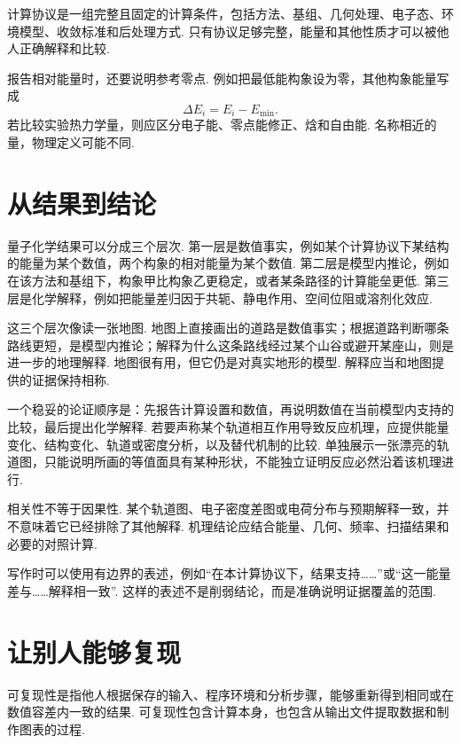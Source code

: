 \documentclass[UTF8,11pt,a4paper,openany]{ctexbook}
\begin{document}
\begin{definitionbox}
计算协议是一组完整且固定的计算条件，包括方法、基组、几何处理、电子态、环境模型、收敛标准和后处理方式. 只有协议足够完整，能量和其他性质才可以被他人正确解释和比较. 
\end{definitionbox}

报告相对能量时，还要说明参考零点. 例如把最低能构象设为零，其他构象能量写成
\[
\Delta E_i=E_i-E_{\min}.
\]
若比较实验热力学量，则应区分电子能、零点能修正、焓和自由能. 名称相近的量，物理定义可能不同. 

\section{从结果到结论}

量子化学结果可以分成三个层次. 第一层是数值事实，例如某个计算协议下某结构的能量为某个数值，两个构象的相对能量为某个数值. 第二层是模型内推论，例如在该方法和基组下，构象甲比构象乙更稳定，或者某条路径的计算能垒更低. 第三层是化学解释，例如把能量差归因于共轭、静电作用、空间位阻或溶剂化效应. 

\begin{analogybox}
这三个层次像读一张地图. 地图上直接画出的道路是数值事实；根据道路判断哪条路线更短，是模型内推论；解释为什么这条路线经过某个山谷或避开某座山，则是进一步的地理解释. 地图很有用，但它仍是对真实地形的模型. 解释应当和地图提供的证据保持相称. 
\end{analogybox}

一个稳妥的论证顺序是：先报告计算设置和数值，再说明数值在当前模型内支持的比较，最后提出化学解释. 若要声称某个轨道相互作用导致反应机理，应提供能量变化、结构变化、轨道或密度分析，以及替代机制的比较. 单独展示一张漂亮的轨道图，只能说明所画的等值面具有某种形状，不能独立证明反应必然沿着该机理进行. 

\begin{limitbox}
相关性不等于因果性. 某个轨道图、电子密度差图或电荷分布与预期解释一致，并不意味着它已经排除了其他解释. 机理结论应结合能量、几何、频率、扫描结果和必要的对照计算. 
\end{limitbox}

写作时可以使用有边界的表述，例如“在本计算协议下，结果支持……”或“这一能量差与……解释相一致”. 这样的表述不是削弱结论，而是准确说明证据覆盖的范围. 

\section{让别人能够复现}

\begin{notationbox}
可复现性是指他人根据保存的输入、程序环境和分析步骤，能够重新得到相同或在数值容差内一致的结果. 可复现性包含计算本身，也包含从输出文件提取数据和制作图表的过程. 
\end{notationbox}
\end{document}
